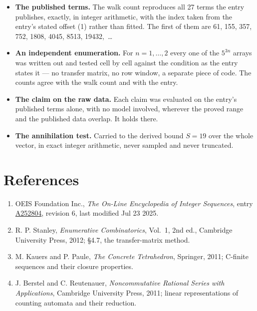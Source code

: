 \documentclass[11pt]{article}
\theoremstyle{definition}
\begin{document}
\begin{itemize}

\item {\bfseries The published terms.} The walk count reproduces all 27 terms the entry publishes, exactly, in integer arithmetic, with the index taken from the entry's stated offset (1) rather than fitted. The first of them are 61, 155, 357, 752, 1808, 4045, 8513, 19432,~\dots

\item {\bfseries An independent enumeration.} For $n = 1,\dots,2$ every one of the $5^{3n}$ arrays was written out and tested cell by cell against the condition as the entry states it --- no transfer matrix, no row window, a separate piece of code. The counts agree with the walk count and with the entry.

\item {\bfseries The claim on the raw data.} Each claim was evaluated on the entry's published terms alone, with no model involved, wherever the proved range and the published data overlap. It holds there.

\item {\bfseries The annihilation test.} Carried to the derived bound $S = 19$ over the whole vector, in exact integer arithmetic, never sampled and never truncated.

\end{itemize}

\section{References}

\begin{enumerate}

\item OEIS Foundation Inc., \emph{The On-Line Encyclopedia of Integer Sequences}, entry \href{https://oeis.org/A252804}{A252804}, revision 6, last modified Jul 23 2025.

\item R. P. Stanley, \emph{Enumerative Combinatorics}, Vol.~1, 2nd ed., Cambridge University Press, 2012; \S4.7, the transfer-matrix method.

\item M. Kauers and P. Paule, \emph{The Concrete Tetrahedron}, Springer, 2011; C-finite sequences and their closure properties.

\item J. Berstel and C. Reutenauer, \emph{Noncommutative Rational Series with Applications}, Cambridge University Press, 2011; linear representations of counting automata and their reduction.

\end{enumerate}
\end{document}
